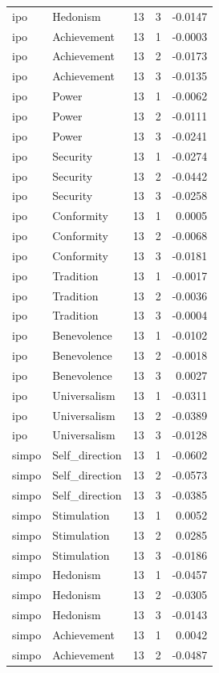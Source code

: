 \begin{tabular}{llrrr}
ipo & Hedonism & 13 & 3 & -0.0147 \\
ipo & Achievement & 13 & 1 & -0.0003 \\
ipo & Achievement & 13 & 2 & -0.0173 \\
ipo & Achievement & 13 & 3 & -0.0135 \\
ipo & Power & 13 & 1 & -0.0062 \\
ipo & Power & 13 & 2 & -0.0111 \\
ipo & Power & 13 & 3 & -0.0241 \\
ipo & Security & 13 & 1 & -0.0274 \\
ipo & Security & 13 & 2 & -0.0442 \\
ipo & Security & 13 & 3 & -0.0258 \\
ipo & Conformity & 13 & 1 & 0.0005 \\
ipo & Conformity & 13 & 2 & -0.0068 \\
ipo & Conformity & 13 & 3 & -0.0181 \\
ipo & Tradition & 13 & 1 & -0.0017 \\
ipo & Tradition & 13 & 2 & -0.0036 \\
ipo & Tradition & 13 & 3 & -0.0004 \\
ipo & Benevolence & 13 & 1 & -0.0102 \\
ipo & Benevolence & 13 & 2 & -0.0018 \\
ipo & Benevolence & 13 & 3 & 0.0027 \\
ipo & Universalism & 13 & 1 & -0.0311 \\
ipo & Universalism & 13 & 2 & -0.0389 \\
ipo & Universalism & 13 & 3 & -0.0128 \\
simpo & Self\_direction & 13 & 1 & -0.0602 \\
simpo & Self\_direction & 13 & 2 & -0.0573 \\
simpo & Self\_direction & 13 & 3 & -0.0385 \\
simpo & Stimulation & 13 & 1 & 0.0052 \\
simpo & Stimulation & 13 & 2 & 0.0285 \\
simpo & Stimulation & 13 & 3 & -0.0186 \\
simpo & Hedonism & 13 & 1 & -0.0457 \\
simpo & Hedonism & 13 & 2 & -0.0305 \\
simpo & Hedonism & 13 & 3 & -0.0143 \\
simpo & Achievement & 13 & 1 & 0.0042 \\
simpo & Achievement & 13 & 2 & -0.0487 \\

\end{tabular}
